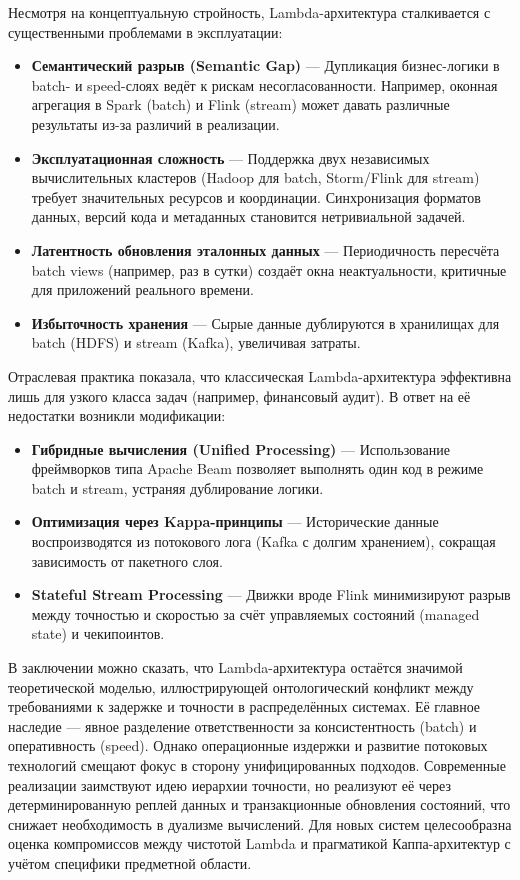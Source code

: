             
            Несмотря на концептуальную стройность, Lambda-архитектура сталкивается с существенными проблемами в эксплуатации:
            \begin{itemize}
                \item \textbf{Семантический разрыв (Semantic Gap)} — Дупликация бизнес-логики в batch- и speed-слоях ведёт к рискам несогласованности. Например, оконная агрегация в Spark (batch) и Flink (stream) может давать различные результаты из-за различий в реализации.
                \item \textbf{Эксплуатационная сложность} — Поддержка двух независимых вычислительных кластеров (Hadoop для batch, Storm/Flink для stream) требует значительных ресурсов и координации. Синхронизация форматов данных, версий кода и метаданных становится нетривиальной задачей.
                \item \textbf{Латентность обновления эталонных данных} — Периодичность пересчёта batch views (например, раз в сутки) создаёт окна неактуальности, критичные для приложений реального времени.
                \item \textbf{Избыточность хранения} — Сырые данные дублируются в хранилищах для batch (HDFS) и stream (Kafka), увеличивая затраты.
            \end{itemize}
            
            
            Отраслевая практика показала, что классическая Lambda-архитектура эффективна лишь для узкого класса задач (например, финансовый аудит). В ответ на её недостатки возникли модификации:
            \begin{itemize}
                \item \textbf{Гибридные вычисления (Unified Processing)} — Использование фреймворков типа Apache Beam позволяет выполнять один код в режиме batch и stream, устраняя дублирование логики.
                \item \textbf{Оптимизация через Kappa-принципы} — Исторические данные воспроизводятся из потокового лога (Kafka с долгим хранением), сокращая зависимость от пакетного слоя.
                \item \textbf{Stateful Stream Processing} — Движки вроде Flink минимизируют разрыв между точностью и скоростью за счёт управляемых состояний (managed state) и чекипоинтов.
            \end{itemize}
            
            
            В заключении можно сказать, что Lambda-архитектура остаётся значимой теоретической моделью, иллюстрирующей онтологический конфликт между требованиями к задержке и точности в распределённых системах. Её главное наследие — явное разделение ответственности за консистентность (batch) и оперативность (speed). Однако операционные издержки и развитие потоковых технологий смещают фокус в сторону унифицированных подходов. Современные реализации заимствуют идею иерархии точности, но реализуют её через детерминированную реплей данных и транзакционные обновления состояний, что снижает необходимость в дуализме вычислений. Для новых систем целесообразна оценка компромиссов между чистотой Lambda и прагматикой Каппа-архитектур с учётом специфики предметной области.

